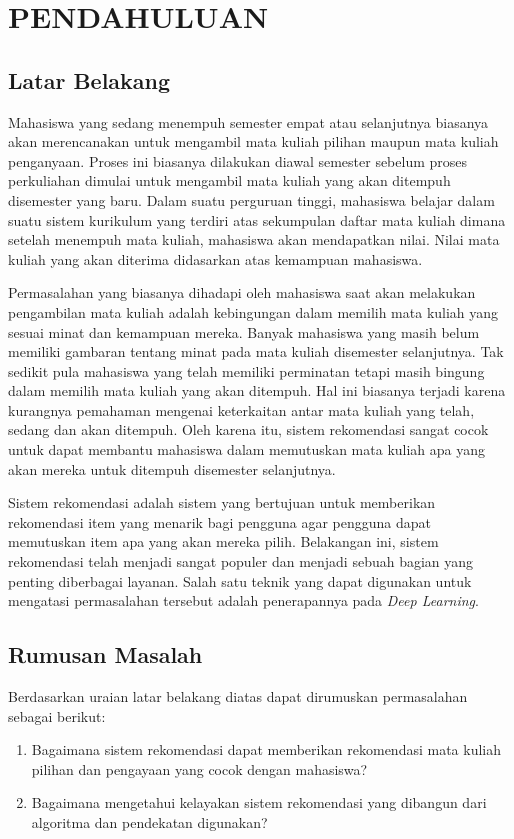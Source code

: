 \chapter{PENDAHULUAN}

\section{Latar Belakang}

Mahasiswa yang sedang menempuh semester empat atau selanjutnya biasanya akan merencanakan untuk mengambil
mata kuliah pilihan maupun mata kuliah penganyaan. Proses ini biasanya dilakukan diawal semester sebelum proses perkuliahan
dimulai untuk mengambil mata kuliah yang akan ditempuh disemester yang baru. Dalam suatu perguruan tinggi, mahasiswa belajar dalam suatu
sistem kurikulum yang terdiri atas sekumpulan daftar mata kuliah dimana setelah menempuh mata kuliah,
mahasiswa akan mendapatkan nilai. Nilai mata kuliah yang akan diterima didasarkan atas kemampuan
mahasiswa.

Permasalahan yang biasanya dihadapi oleh mahasiswa saat akan melakukan pengambilan mata kuliah adalah kebingungan dalam
memilih mata kuliah yang sesuai minat dan kemampuan mereka. Banyak mahasiswa yang masih belum memiliki gambaran tentang
minat pada mata kuliah disemester selanjutnya. Tak sedikit pula mahasiswa yang telah memiliki perminatan tetapi masih
bingung dalam memilih mata kuliah yang akan ditempuh. Hal ini biasanya terjadi karena kurangnya pemahaman mengenai
keterkaitan antar mata kuliah yang telah, sedang dan akan ditempuh. Oleh karena itu, sistem rekomendasi sangat cocok untuk
dapat membantu mahasiswa dalam memutuskan mata kuliah apa yang akan mereka untuk ditempuh disemester selanjutnya.

Sistem rekomendasi adalah sistem yang bertujuan untuk memberikan rekomendasi item yang menarik bagi pengguna agar pengguna
dapat memutuskan item apa yang akan mereka pilih. Belakangan ini, sistem rekomendasi telah menjadi sangat populer dan menjadi
sebuah bagian yang penting diberbagai layanan. Salah satu teknik yang dapat digunakan untuk mengatasi permasalahan tersebut adalah
penerapannya pada \emph{Deep Learning}.

\section{Rumusan Masalah}
Berdasarkan uraian latar belakang diatas dapat dirumuskan permasalahan sebagai berikut:
\begin{enumerate}[noitemsep]
      \item Bagaimana sistem rekomendasi dapat memberikan rekomendasi mata kuliah pilihan dan pengayaan
            yang cocok dengan mahasiswa?
      \item Bagaimana mengetahui kelayakan sistem rekomendasi yang dibangun dari algoritma dan pendekatan
            digunakan?
\end{enumerate}


